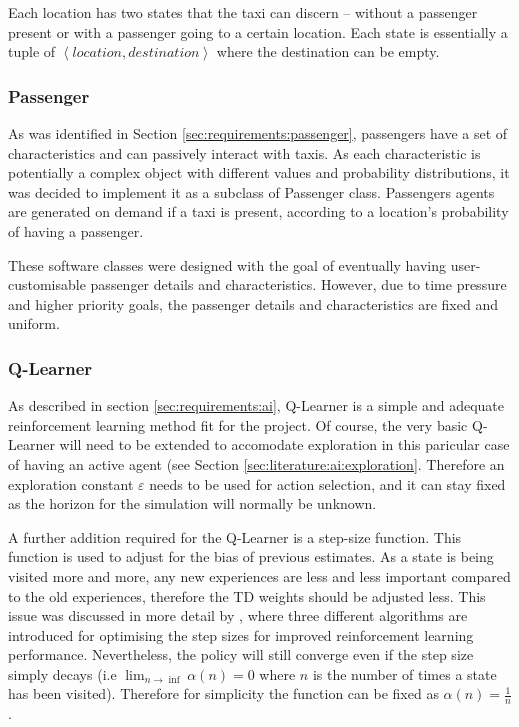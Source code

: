 Each location has two states that the taxi can discern -- without a passenger
present or with a passenger going to a certain location. Each state is
essentially a tuple of \(\left \langle location, destination \right \rangle\)
where the destination can be empty.


\subsubsection{Passenger}
\label{sec:implementation:passenger}

As was identified in Section \ref{sec:requirements:passenger}, passengers have
a set of characteristics and can passively interact with taxis. As each
characteristic is potentially a complex object with different values and
probability distributions, it was decided to implement it as a subclass of
Passenger class. Passengers agents are generated on demand if a taxi is
present, according to a location's probability of having a passenger.

These software classes were designed with the goal of eventually having user-
customisable passenger details and characteristics. However, due to time
pressure and higher priority goals, the passenger details and characteristics
are fixed and uniform.


\subsubsection{Q-Learner}
\label{sec:implementation:ai}

As described in section \ref{sec:requirements:ai}, Q-Learner is a simple and
adequate reinforcement learning method fit for the project. Of course, the very
basic Q-Learner will need to be extended to accomodate exploration in this
paricular case of having an active agent (see Section
\ref{sec:literature:ai:exploration}. Therefore an exploration constant
\(\varepsilon\) needs to be used for action selection, and it can stay fixed as
the horizon for the simulation will normally be unknown.

A further addition required for the Q-Learner is a step-size function. This
function is used to adjust for the bias of previous estimates. As a state is
being visited more and more, any new experiences are less and less important
compared to the old experiences, therefore the TD weights should be adjusted
less. This issue was discussed in more detail by
\textcite{Sutton1994ai+stepsize}, where three different algorithms are
introduced for optimising the step sizes for improved reinforcement learning
performance. Nevertheless, the policy will still converge even if the step size
simply decays (i.e \(\lim_{n \to \inf}\alpha(n) = 0\) where \(n\) is the number
of times a state has been visited). Therefore for simplicity the function can
be fixed as \(\alpha(n)=\frac{1}{n}\).

